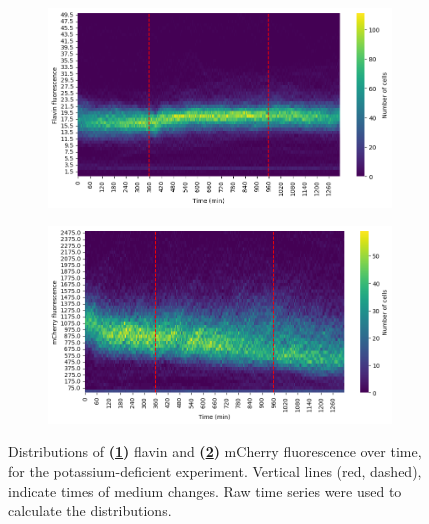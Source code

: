 \begin{figure}[hb!]
  \centering
  \begin{subfigure}[htpb]{0.5\textwidth}
   \centering
   \includegraphics[width=\textwidth]{613_distribs_flavin.png}
   \caption{
   }
   \label{fig:biology-kdeficient-histogram-flavin}
  \end{subfigure}%
  \begin{subfigure}[htpb]{0.5\textwidth}
   \centering
   \includegraphics[width=\textwidth]{613_distribs_mCherry.png}
   \caption{
   }
   \label{fig:biology-kdeficient-histogram-mCherry}
  \end{subfigure}

  \caption[
    Distributions of flavin and mCherry fluorescence over time, for the potassium-deficient experiment.
  ]{
    Distributions of \textbf{(\ref{fig:biology-kdeficient-histogram-flavin})} flavin and \textbf{(\ref{fig:biology-kdeficient-histogram-mCherry})} mCherry fluorescence over time, for the potassium-deficient experiment.
    Vertical lines (red, dashed), indicate times of medium changes.
    Raw time series were used to calculate the distributions.
  }
  \label{fig:biology-kdeficient-histogram}
\end{figure}


